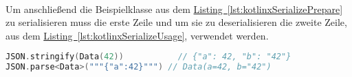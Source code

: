 \\
Um anschließend die Beispielklasse  aus dem \hyperref[lst:kotlinxSerializePrepare]{Listing~\ref{lst:kotlinxSerializePrepare}} zu serialisieren muss die erste Zeile und um sie zu deserialisieren die zweite Zeile, aus dem \hyperref[lst:kotlinxSerializeUsage]{Listing~\ref{lst:kotlinxSerializeUsage}}, verwendet werden.
\\
\begin{lstlisting}[style=lstStyleFramed, language=Kotlin, caption={Beispiel: Serializierung und Deserialisierung der \code{Data} Klasse (verändert nach \cite{kotlinxSerializationExample})}, label=lst:kotlinxSerializeUsage, float]
JSON.stringify(Data(42))   		   // {"a": 42, "b": "42"}
JSON.parse<Data>("""{"a":42}""") // Data(a=42, b="42")
\end{lstlisting}

